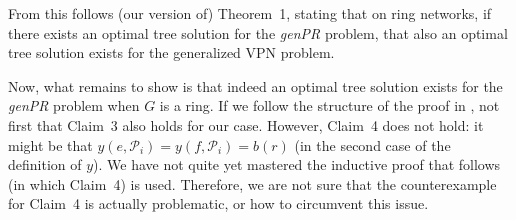 \documentclass[11pt]{article}
\theoremstyle{definition}
\begin{document}
    From this follows (our version of) Theorem~1, stating that on ring networks, if there exists an optimal tree solution for the \emph{genPR} problem, that also an optimal tree solution exists for the generalized VPN problem.

    Now, what remains to show is that indeed an optimal tree solution exists for the \emph{genPR} problem when $G$ is a ring.
    If we follow the structure of the proof in \cite{grandoni2008short}, not first that Claim~3 also holds for our case.
    However, Claim~4 does not hold: it might be that $y(e, \mathcal P_i) = y(f, \mathcal P_i) = b(r)$ (in the second case of the definition of $y$).
    We have not quite yet mastered the inductive proof that follows (in which Claim~4) is used.
    Therefore, we are not sure that the counterexample for Claim~4 is actually problematic, or how to circumvent this issue.

    
    
\end{document}
